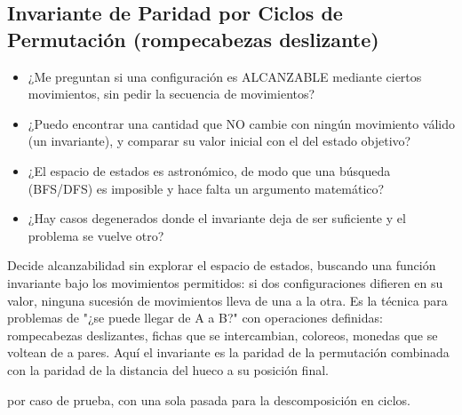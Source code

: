 \subsection{Invariante de Paridad por Ciclos de Permutación (rompecabezas deslizante)}
\label{alg:7-6}


\begin{itemize}
\item ¿Me preguntan si una configuración es ALCANZABLE mediante ciertos movimientos, sin pedir la secuencia de movimientos?
\item ¿Puedo encontrar una cantidad que NO cambie con ningún movimiento válido (un invariante), y comparar su valor inicial con el del estado objetivo?
\item ¿El espacio de estados es astronómico, de modo que una búsqueda (BFS/DFS) es imposible y hace falta un argumento matemático?
\item ¿Hay casos degenerados donde el invariante deja de ser suficiente y el problema se vuelve otro?
\end{itemize}

 Decide alcanzabilidad sin explorar el espacio de estados, buscando una función invariante bajo los movimientos permitidos: si dos configuraciones difieren en su valor, ninguna sucesión de movimientos lleva de una a la otra. Es la técnica para problemas de "¿se puede llegar de A a B?" con operaciones definidas: rompecabezas deslizantes, fichas que se intercambian, coloreos, monedas que se voltean de a pares. Aquí el invariante es la paridad de la permutación combinada con la paridad de la distancia del hueco a su posición final.

  por caso de prueba, con una sola pasada para la descomposición en ciclos.

